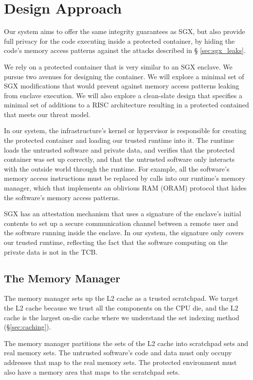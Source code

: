 \section{Design Approach}
\label{sec:design}

Our system aims to offer the same integrity guarantees as SGX, but also provide
full privacy for the code executing inside a protected container, by hiding the
code's memory access patterns against the attacks described in \S
\ref{sec:sgx_leaks}.

We rely on a protected container that is very similar to an SGX enclave. We
pursue two avenues for designing the container. We will explore a minimal set
of SGX modifications that would prevent against memory access patterns leaking
from enclave execution. We will also explore a clean-slate design that
specifies a minimal set of additions to a RISC architecture resulting in a
protected contained that meets our threat model.

In our system, the infrastructure's kernel or hypervisor is responsible for
creating the protected container and loading our trusted runtime into it. The
runtime loads the untrusted software and private data, and verifies that the
protected container was set up correctly, and that the untrusted software
only interacts with the outside world through the runtime. For example, all
the software's memory access instructions must be replaced by calls into our
runtime's memory manager, which that implements an oblivious RAM (ORAM)
protocol \cite{stefanov2013path} that hides the software's memory access
patterns.

SGX has an attestation mechanism that uses a signature of the enclave's initial
contents to set up a secure communication channel between a remote user and
the software running inside the enclave. In our system, the signature only
covers our trusted runtime, reflecting the fact that the software computing on
the private data is not in the TCB.


\subsection{The Memory Manager}
\label{sec:memory_manager}

The memory manager sets up the L2 cache as a trusted scratchpad. We target the
L2 cache because we trust all the components on the CPU die, and the L2 cache
is the largest on-die cache where we understand the set indexing method
(\S \ref{sec:caching}).

The memory manager partitions the sets of the L2 cache into scratchpad sets and
real memory sets. The untrusted software's code and data must only occupy
addresses that map to the real memory sets. The protected environment must also
have a memory area that maps to the scratchpad sets.


